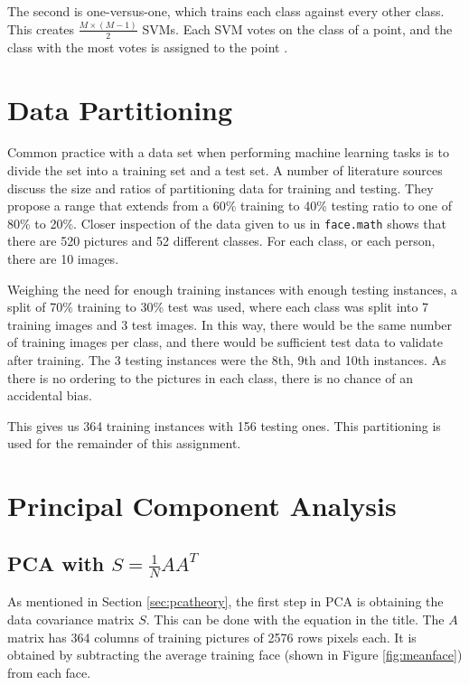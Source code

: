 \documentclass[a4paper, 10pt, conference]{ieeeconf}
\begin{document}
The second is one-versus-one, which trains each class against every other class. This creates $\frac{M \times (M-1)}{2}$ SVMs. Each SVM votes on the class of a point, and the class with the most votes is assigned to the point \cite{svm}.

%
\section{Data Partitioning}

Common practice with a data set when performing machine learning tasks is to divide the set into a training set and a test set. A number of literature sources discuss the size and ratios of partitioning data for training and testing. They propose a range that extends from a 60\% training to 40\% testing ratio to one of 80\% to 20\%. Closer inspection of the data given to us in \texttt{face.math} shows that there are 520 pictures and 52 different classes. For each class, or each person, there are 10 images.

Weighing the need for enough training instances with enough testing instances, a split of 70\% training to 30\% test was used, where each class was split into 7 training images and 3 test images. In this way, there would be the same number of training images per class, and there would be sufficient test data to validate after training. The 3 testing instances were the 8th, 9th and 10th instances. As there is no ordering to the pictures in each class, there is no chance of an accidental bias.

This gives us 364 training instances with 156 testing ones. This partitioning is used for the remainder of this assignment.

\section{Principal Component Analysis}


\subsection{PCA with $S = \frac{1}{N}AA^{T}$}
As mentioned in Section \ref{sec:pcatheory}, the first step in PCA is obtaining the data covariance matrix $S$. This can be done with the equation in the title. The $A$ matrix has 364 columns of training pictures of 2576 rows pixels each. It is obtained by subtracting the average training face (shown in Figure \ref{fig:meanface}) from each face.
\end{document}
